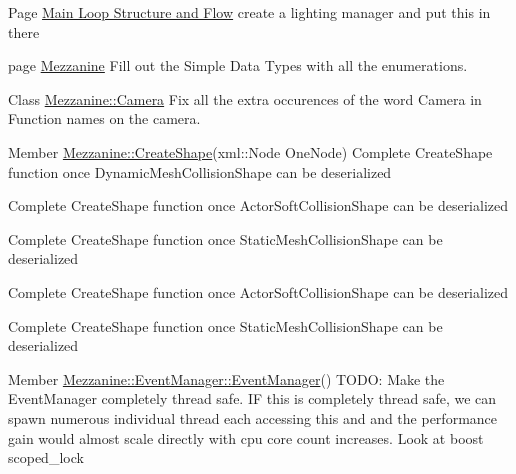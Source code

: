 \label{todo__todo000031}
\hypertarget{todo__todo000031}{}
 
\begin{DoxyDescription}
\item[Page \hyperlink{mainloop1}{Main Loop Structure and Flow} ]create a lighting manager and put this in there 
\end{DoxyDescription}

\label{todo__todo000032}
\hypertarget{todo__todo000032}{}
 
\begin{DoxyDescription}
\item[page \hyperlink{index}{Mezzanine} ]Fill out the Simple Data Types with all the enumerations.
\end{DoxyDescription}

\label{todo__todo000002}
\hypertarget{todo__todo000002}{}
 
\begin{DoxyDescription}
\item[Class \hyperlink{classMezzanine_1_1Camera}{Mezzanine::Camera} ]Fix all the extra occurences of the word Camera in Function names on the camera. 
\end{DoxyDescription}

\label{todo__todo000004}
\hypertarget{todo__todo000004}{}
 
\begin{DoxyDescription}
\item[Member \hyperlink{namespaceMezzanine_ac7be2623357ff699de474212404a4227}{Mezzanine::CreateShape}(xml::Node OneNode) ]Complete CreateShape function once DynamicMeshCollisionShape can be deserialized 

Complete CreateShape function once ActorSoftCollisionShape can be deserialized 

Complete CreateShape function once StaticMeshCollisionShape can be deserialized 

Complete CreateShape function once ActorSoftCollisionShape can be deserialized 

Complete CreateShape function once StaticMeshCollisionShape can be deserialized 
\end{DoxyDescription}

\label{todo__todo000010}
\hypertarget{todo__todo000010}{}
 
\begin{DoxyDescription}
\item[Member \hyperlink{classMezzanine_1_1EventManager_a95ce9d2d865b0d8d9468448969b0ade2}{Mezzanine::EventManager::EventManager}() ]TODO: Make the EventManager completely thread safe. IF this is completely thread safe, we can spawn numerous individual thread each accessing this and and the performance gain would almost scale directly with cpu core count increases. Look at boost scoped\_\-lock 
\end{DoxyDescription}

